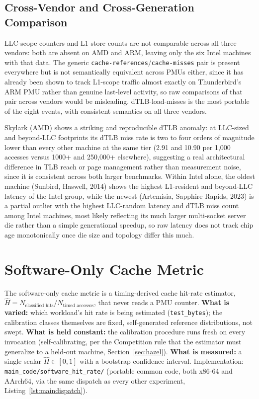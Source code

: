 \documentclass{article}
\begin{document}
\subsection{Cross-Vendor and Cross-Generation Comparison}
LLC-scope counters and L1 store counts are not comparable across all three vendors: both are absent on AMD and ARM, leaving only the six Intel machines with that data. The generic \texttt{cache-references}/\texttt{cache-misses} pair is present everywhere but is not semantically equivalent across PMUs either, since it has already been shown to track L1-scope traffic almost exactly on Thunderbird's ARM PMU rather than genuine last-level activity, so raw comparisons of that pair across vendors would be misleading. dTLB-load-misses is the most portable of the eight events, with consistent semantics on all three vendors.

Skylark (AMD) shows a striking and reproducible dTLB anomaly: at LLC-sized and beyond-LLC footprints its dTLB miss rate is two to four orders of magnitude lower than every other machine at the same tier (2.91 and 10.90 per 1{,}000 accesses versus 1000+ and 250{,}000+ elsewhere), suggesting a real architectural difference in TLB reach or page management rather than measurement noise, since it is consistent across both larger benchmarks. Within Intel alone, the oldest machine (Sunbird, Haswell, 2014) shows the highest L1-resident and beyond-LLC latency of the Intel group, while the newest (Artemisia, Sapphire Rapids, 2023) is a partial outlier with the highest LLC-random latency and dTLB miss count among Intel machines, most likely reflecting its much larger multi-socket server die rather than a simple generational speedup, so raw latency does not track chip age monotonically once die size and topology differ this much.

\section{Software-Only Cache Metric}
\label{sec:hitrate}

The software-only cache metric is a timing-derived cache hit-rate estimator,
$\widehat{H} = N_{\text{classified hits}} / N_{\text{timed accesses}}$, that never reads a
PMU counter. \textbf{What is varied:} which workload's hit rate is being estimated
(\texttt{test\_bytes}); the calibration classes themselves are fixed, self-generated
reference distributions, not swept. \textbf{What is held constant:} the calibration
procedure runs fresh on every invocation (self-calibrating, per the Competition rule that
the estimator must generalize to a held-out machine, Section~\ref{sec:hazel}).
\textbf{What is measured:} a single scalar $\widehat{H} \in [0,1]$ with a bootstrap
confidence interval. Implementation: \texttt{main\_code/software\_hit\_rate/} (portable
common code, both x86-64 and AArch64, via the same dispatch as every other experiment,
Listing~\ref{lst:maindispatch}).
\end{document}
